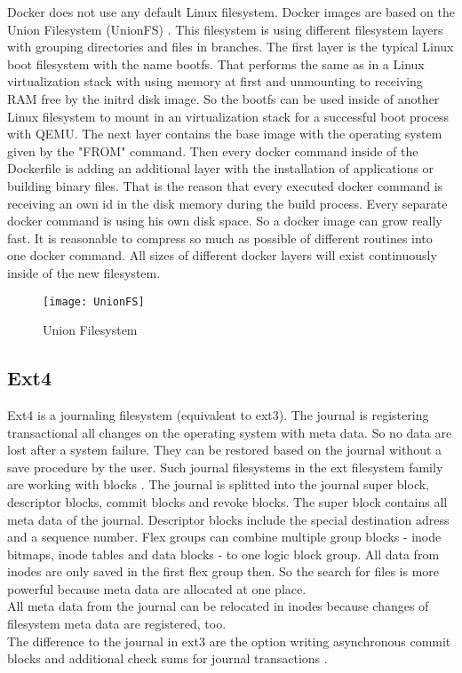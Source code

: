 Docker does not use any default Linux filesystem. 
Docker images are based on the Union Filesystem (UnionFS) \cite[~p.21]{Ashraf2015}. 
This filesystem is using different filesystem layers with grouping directories and files in branches. 
The first layer is the typical Linux boot filesystem with the name bootfs. 
That performs the same as in a Linux virtualization stack with using memory at first and unmounting to receiving RAM free by the initrd disk image. 
So the bootfs can be used inside of another Linux filesystem to mount in an virtualization stack for a successful boot process with QEMU.
The next layer contains the base image with the operating system given by the "FROM" command.
Then every docker command inside of the Dockerfile is adding an additional layer with the installation of applications or building binary files.
That is the reason that every executed docker command is receiving an own id in the disk memory during the build process.
Every separate docker command is using his own disk space. So a docker image can grow really fast.
It is reasonable to compress so much as possible of different routines into one docker command. 
All sizes of different docker layers will exist continuously inside of the new filesystem.

\begin{figure}[H]
\centering
\texttt{[image: UnionFS]}
 \caption{Union Filesystem}
    \label{UnionFS}
\end{figure}

\subsection{Ext4}

Ext4 is a journaling filesystem (equivalent to ext3). The journal is registering transactional all changes on the operating system with meta data.
So no data  are lost after a system failure. They can be restored based on the journal without a save procedure by the user.
Such journal filesystems in the ext filesystem family are working with blocks \cite[~p.20]{Seufert2015}.
The journal is splitted into the journal super block, descriptor blocks, commit blocks and revoke blocks.
The super block contains all meta data of the journal. Descriptor blocks include the special destination adress and a sequence number. 
Flex groups can combine multiple group blocks - inode bitmaps, inode tables and data blocks - to one logic block group. All data from inodes are only saved in the first flex group then. 
So the search for files is more powerful because meta data are allocated at one place.\\
All meta data from the journal can be relocated in inodes because changes of filesystem meta data are registered, too. \\
The difference to the journal in ext3 are the option writing asynchronous commit blocks and additional check sums for journal transactions \cite[~p.28]{Seufert2015}.

